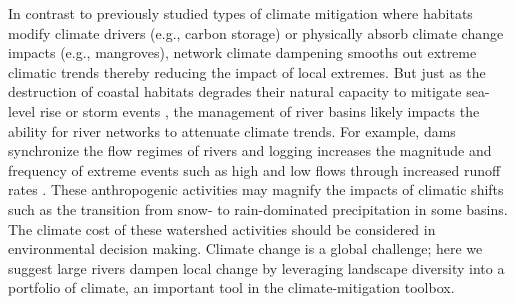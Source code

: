 \documentclass[9pt,twocolumn,twoside,lineno]{pnas-new}
\begin{document}
In contrast to previously studied types of climate mitigation where habitats modify climate drivers (e.g., carbon storage) or physically absorb climate change impacts (e.g., mangroves), network climate dampening smooths out extreme climatic trends thereby reducing the impact of local extremes. But just as the destruction of coastal habitats degrades their natural capacity to mitigate sea-level rise or storm events \cite{Arkema:2013}, the management of river basins likely impacts the ability for river networks to attenuate climate trends. For example, dams synchronize the flow regimes of rivers \cite{Poff:2007} and logging increases the magnitude and frequency of extreme events such as high and low flows through increased runoff rates \cite{Zhang:2014}. These anthropogenic activities may magnify the impacts of climatic shifts such as the transition from snow- to rain-dominated precipitation in some basins. The climate cost of these watershed activities should be considered in environmental decision making. Climate change is a global challenge; here we suggest large rivers dampen local change by leveraging landscape diversity into a portfolio of climate, an important tool in the climate-mitigation toolbox.
\end{document}
